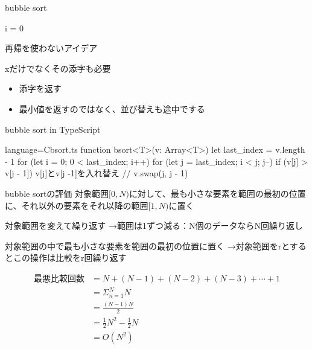 \documentclass{beamer}
\begin{document}
\begin{frame}[fragile]{bubble sort}{}
\begin{algorithm}[H]
\BlankLine
i = 0
\caption[page]{再帰を使わないアイデア}
\end{algorithm}

xだけでなくその添字も必要
\begin{itemize}%
\item 添字を返す
\item 最小値を返すのではなく、並び替えも途中でする
\end{itemize}
\end{frame}

\begin{frame}[fragile]{bubble sort in TypeScript}{}

\begin{codeof}{language=C}{bsort.ts}
function bsort<T>(v: Array<T>) {
  let last_index = v.length - 1
  for (let i = 0; 0 < last_index; i++) {
    for (let j = last_index; i < j; j--) {
      if (v[j] > v[j - 1]) {
        v[j]とv[j -1]を入れ替え // v.swap(j, j - 1)
      }
    }
  }
}
\end{codeof}
\end{frame}

\begin{frame}[fragile]{bubble sortの評価}{}
対象範囲$[0, N)$に対して、最も小さな要素を範囲の最初の位置に、それ以外の要素をそれ以降の範囲$[1, N)$に置く

対象範囲を変えて繰り返す
→範囲は1ずつ減る：N個のデータならN回繰り返し


対象範囲の中で最も小さな要素を範囲の最初の位置に置く
→対象範囲をrとするとこの操作は比較をr回繰り返す

\begin{align*}
最悪比較回数 &= N + (N - 1) + (N - 2) + (N - 3) + \cdots + 1 \\
&= \Sigma_{n=1}^{N}N \\
&= \frac{(N-1)N}{2} \\
&= \frac{1}{2}N^2 - \frac{1}{2}N \\
&= O(N^2)
\end{align*}

\end{frame}
\end{document}
